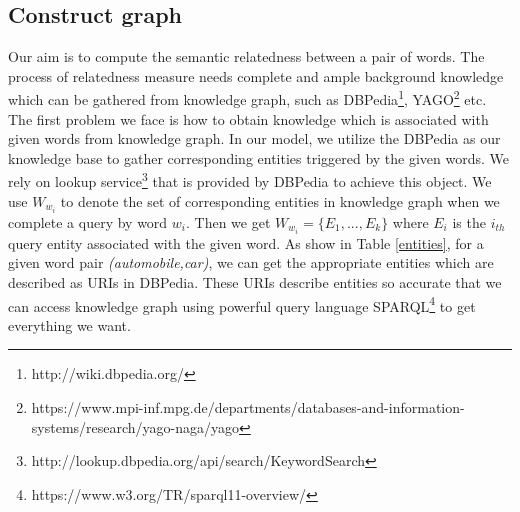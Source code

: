 \subsection{Construct graph}
\label{sec:construct graph}
Our aim is to compute the semantic relatedness between a pair of words. The process of relatedness measure
needs complete and ample background knowledge which can be gathered from knowledge graph, such as
DBPedia\footnote{http://wiki.dbpedia.org/}, 
YAGO\footnote{https://www.mpi-inf.mpg.de/departments/databases-and-information-systems/research/yago-naga/yago} etc.
The first problem we face is how to obtain knowledge which is associated with given words from knowledge graph. 
In our model, we utilize the DBPedia as our knowledge base to gather corresponding entities triggered by the given words.
We rely on lookup service\footnote{http://lookup.dbpedia.org/api/search/KeywordSearch} that is provided by DBPedia to achieve this object. 
We use $W_{w_i}$ to denote the set of corresponding entities in knowledge graph when we complete a query by word $w_i$.
Then we get $W_{w_i}=\{E_1,...,E_k\}$ where $E_i$ is the $i_{th}$ query entity associated with the given word.
As show in Table \ref{entities}, for a given word pair \emph{(automobile,car)}, 
we can get the appropriate entities which are described as URIs in DBPedia. 
These URIs describe entities so accurate that we can access knowledge graph using powerful
query language SPARQL\footnote{https://www.w3.org/TR/sparql11-overview/} to get everything we want.

\begin{table*}[]
    \small
    \centering
    \caption{Query Entities (\emph{DBPedia:} equals \emph{http://dbpedia.org/resource/})}
    \label{entities}
    \renewcommand\arraystretch{1.6}
\end{table*}


